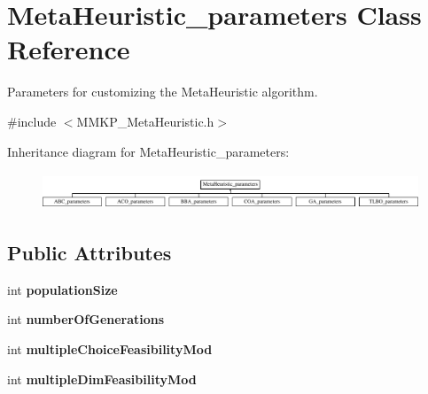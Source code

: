 \hypertarget{class_meta_heuristic__parameters}{\section{Meta\+Heuristic\+\_\+parameters Class Reference}
\label{class_meta_heuristic__parameters}
}


Parameters for customizing the Meta\+Heuristic algorithm.  




{\ttfamily \#include $<$M\+M\+K\+P\+\_\+\+Meta\+Heuristic.\+h$>$}

Inheritance diagram for Meta\+Heuristic\+\_\+parameters\+:\begin{figure}[H]
\begin{center}
\leavevmode
\includegraphics[height=1.111111cm]{class_meta_heuristic__parameters}
\end{center}
\end{figure}
\subsection*{Public Attributes}
\begin{DoxyCompactItemize}
\item 
\hypertarget{class_meta_heuristic__parameters_a24871d991521941727591be8555c9ed4}{int {\bfseries population\+Size}}\label{class_meta_heuristic__parameters_a24871d991521941727591be8555c9ed4}

\item 
\hypertarget{class_meta_heuristic__parameters_ae30f5d20695b5acadc0e7e0d60620f99}{int {\bfseries number\+Of\+Generations}}\label{class_meta_heuristic__parameters_ae30f5d20695b5acadc0e7e0d60620f99}

\item 
\hypertarget{class_meta_heuristic__parameters_aef3eb99f9e53c1c0c81498afedeb1cb8}{int {\bfseries multiple\+Choice\+Feasibility\+Mod}}\label{class_meta_heuristic__parameters_aef3eb99f9e53c1c0c81498afedeb1cb8}

\item 
\hypertarget{class_meta_heuristic__parameters_a6cb00f84dd24d56104016608fbb0d7a7}{int {\bfseries multiple\+Dim\+Feasibility\+Mod}}\label{class_meta_heuristic__parameters_a6cb00f84dd24d56104016608fbb0d7a7}

\end{DoxyCompactItemize}


